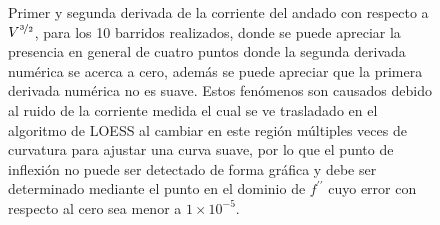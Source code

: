 \begin{figure}[H]
\caption{Primer y segunda derivada de la corriente del andado con respecto a $V^{\nicefrac{3}{2}}$, para los 10 barridos realizados, donde se puede apreciar la presencia en general de cuatro puntos donde la segunda derivada numérica se acerca a cero, además se puede apreciar que la primera derivada numérica no es suave. Estos fenómenos son causados debido al ruido de la corriente medida el cual se ve trasladado en el algoritmo de LOESS al cambiar en este región múltiples veces de curvatura para ajustar una curva suave, por lo que el punto de inflexión no puede ser detectado de forma gráfica y debe ser determinado mediante el punto en el dominio de $f^{\prime \prime}$ cuyo error con respecto al cero sea menor a $1\times10^{-5}$.}
\label{fig:potderps}
\end{figure}

\twocolumngrid